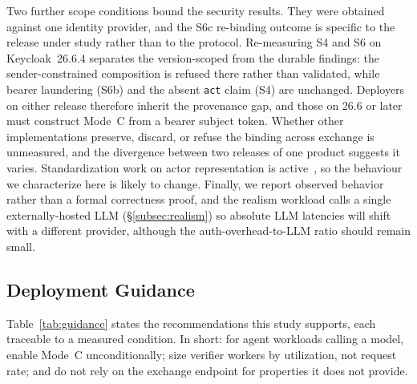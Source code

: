 \documentclass[conference]{IEEEtran}
\begin{document}
Two further scope conditions bound the security results. They were obtained against one identity provider, and the S6c re-binding outcome is specific to the release under study rather than to the protocol. Re-measuring S4 and S6 on Keycloak~26.6.4 separates the version-scoped from the durable findings: the sender-constrained composition is refused there rather than validated, while bearer laundering (S6b) and the absent \texttt{act} claim (S4) are unchanged. Deployers on either release therefore inherit the provenance gap, and those on 26.6 or later must construct Mode~C from a bearer subject token. Whether other implementations preserve, discard, or refuse the binding across exchange is unmeasured, and the divergence between two releases of one product suggests it varies. Standardization work on actor representation is active~\cite{mcguinness2026actor}, so the behaviour we characterize here is likely to change. Finally, we report observed behavior rather than a formal correctness proof, and the realism workload calls a single externally-hosted LLM (\S\ref{subsec:realism}) so absolute LLM latencies will shift with a different provider, although the auth-overhead-to-LLM ratio should remain small.

\subsection{Deployment Guidance}

Table~\ref{tab:guidance} states the recommendations this study supports, each traceable to a measured condition. In short: for agent workloads calling a model, enable Mode~C unconditionally; size verifier workers by utilization, not request rate; and do not rely on the exchange endpoint for properties it does not provide.
\end{document}

